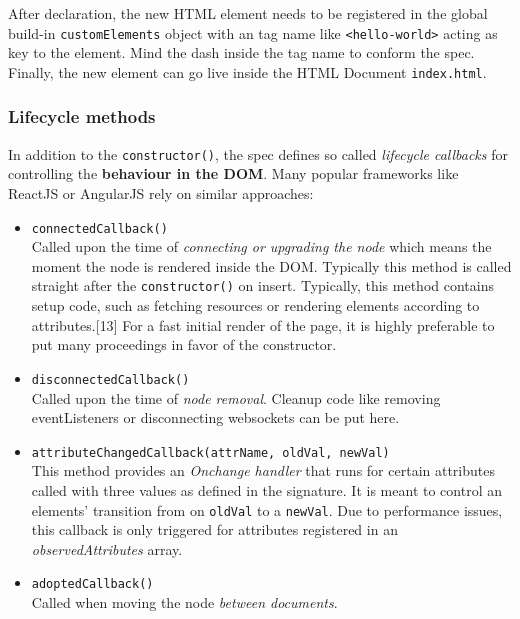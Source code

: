 \documentclass[]{article}
\providecommand{\tightlist}{%
  \setlength{\itemsep}{0pt}\setlength{\parskip}{0pt}}
\begin{document}
After declaration, the new HTML element needs to be registered in the
global build-in \texttt{customElements} object with an tag name like
\texttt{\textless{}hello-world\textgreater{}} acting as key to the
element. Mind the dash inside the tag name to conform the spec. Finally,
the new element can go live inside the HTML Document
\texttt{index.html}.

\subsubsection{Lifecycle methods}\label{lifecycle-methods}

In addition to the \texttt{constructor()}, the spec defines so called
\emph{lifecycle callbacks} for controlling the \textbf{behaviour in the
DOM}. Many popular frameworks like ReactJS or AngularJS rely on similar
approaches:

\begin{itemize}
\tightlist
\item
  \texttt{connectedCallback()}\\
  Called upon the time of \emph{connecting or upgrading the node} which
  means the moment the node is rendered inside the DOM. Typically this
  method is called straight after the \texttt{constructor()} on insert.
  Typically, this method contains setup code, such as fetching resources
  or rendering elements according to attributes.{[}13{]} For a fast
  initial render of the page, it is highly preferable to put many
  proceedings in favor of the constructor.
\item
  \texttt{disconnectedCallback()}\\
  Called upon the time of \emph{node removal}. Cleanup code like
  removing eventListeners or disconnecting websockets can be put here.
\item
  \texttt{attributeChangedCallback(attrName,\ oldVal,\ newVal)}\\
  This method provides an \emph{Onchange handler} that runs for certain
  attributes called with three values as defined in the signature. It is
  meant to control an elements' transition from on \texttt{oldVal} to a
  \texttt{newVal}. Due to performance issues, this callback is only
  triggered for attributes registered in an \emph{observedAttributes}
  array.
\item
  \texttt{adoptedCallback()}\\
  Called when moving the node \emph{between documents}.
\end{itemize}
\end{document}
